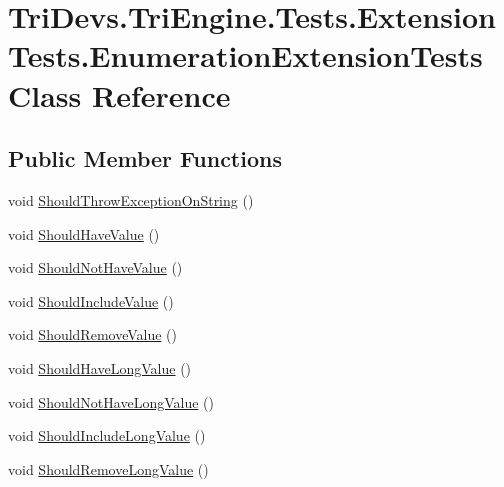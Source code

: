 \hypertarget{class_tri_devs_1_1_tri_engine_1_1_tests_1_1_extension_tests_1_1_enumeration_extension_tests}{\section{Tri\-Devs.\-Tri\-Engine.\-Tests.\-Extension\-Tests.\-Enumeration\-Extension\-Tests Class Reference}
\label{class_tri_devs_1_1_tri_engine_1_1_tests_1_1_extension_tests_1_1_enumeration_extension_tests}
}
\subsection*{Public Member Functions}
\begin{DoxyCompactItemize}
\item 
void \hyperlink{class_tri_devs_1_1_tri_engine_1_1_tests_1_1_extension_tests_1_1_enumeration_extension_tests_a5f7e18a2497f6815beafd2480371f791}{Should\-Throw\-Exception\-On\-String} ()
\item 
void \hyperlink{class_tri_devs_1_1_tri_engine_1_1_tests_1_1_extension_tests_1_1_enumeration_extension_tests_ab478b0b1e393a058b01016c1d1278bca}{Should\-Have\-Value} ()
\item 
void \hyperlink{class_tri_devs_1_1_tri_engine_1_1_tests_1_1_extension_tests_1_1_enumeration_extension_tests_acfb1da41dacc4ded5f72f754f88987bc}{Should\-Not\-Have\-Value} ()
\item 
void \hyperlink{class_tri_devs_1_1_tri_engine_1_1_tests_1_1_extension_tests_1_1_enumeration_extension_tests_af02c281088819b6865faaf8a819ea489}{Should\-Include\-Value} ()
\item 
void \hyperlink{class_tri_devs_1_1_tri_engine_1_1_tests_1_1_extension_tests_1_1_enumeration_extension_tests_ab2e9adf4cbf34e5dbc938ad72ec5d433}{Should\-Remove\-Value} ()
\item 
void \hyperlink{class_tri_devs_1_1_tri_engine_1_1_tests_1_1_extension_tests_1_1_enumeration_extension_tests_a61d35b1275283463b3b63dc1d5420b28}{Should\-Have\-Long\-Value} ()
\item 
void \hyperlink{class_tri_devs_1_1_tri_engine_1_1_tests_1_1_extension_tests_1_1_enumeration_extension_tests_a93ebf6ec35d71cb1617a46a1141d11a3}{Should\-Not\-Have\-Long\-Value} ()
\item 
void \hyperlink{class_tri_devs_1_1_tri_engine_1_1_tests_1_1_extension_tests_1_1_enumeration_extension_tests_a5bab5f7291b0096dca4865f0e84b0e34}{Should\-Include\-Long\-Value} ()
\item 
void \hyperlink{class_tri_devs_1_1_tri_engine_1_1_tests_1_1_extension_tests_1_1_enumeration_extension_tests_a921e5b89652301f2b4a02ed63f284eed}{Should\-Remove\-Long\-Value} ()
\end{DoxyCompactItemize}



